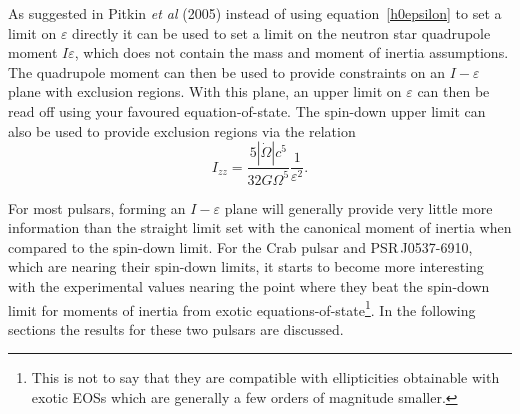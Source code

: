As suggested in Pitkin {\it et al} (2005) \cite{Pitkin:2005} instead of using
equation~\ref{h0epsilon} to set a limit on $\varepsilon$ directly it can be used to set a limit on
the neutron star quadrupole moment $I\varepsilon$, which does not contain the mass and moment of
inertia assumptions. The quadrupole moment can then be used to provide constraints on an
$I-\varepsilon$ plane with exclusion regions. With this plane, an upper limit on $\varepsilon$ can
then be read off using your favoured equation-of-state. The spin-down upper limit can also be used
to provide exclusion regions via the relation
\begin{equation}
I_{zz} = \frac{5|\dot{\Omega}|c^5}{32G\Omega^5}\frac{1}{\varepsilon^2}.
\end{equation}

For most pulsars, forming an $I-\varepsilon$ plane will generally provide very little more
information than the straight limit set with the canonical moment of inertia when compared to the
spin-down limit. For the Crab pulsar and PSR\,J0537-6910, which are nearing their spin-down
limits, it starts to become more interesting with the experimental values nearing the point where
they beat the spin-down limit for moments of inertia from exotic equations-of-state\footnote{This
is not to say that they are compatible with ellipticities obtainable with exotic EOSs which are
generally a few orders of magnitude smaller.}. In the following sections the results for these two
pulsars are discussed.

